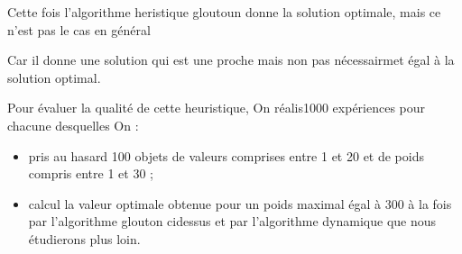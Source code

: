 \documentclass[letterpaper,10pt,english]{jupyterBook}
\begin{document}
\sphinxAtStartPar
Cette fois l’algorithme heristique gloutoun donne la solution optimale, mais ce n’est pas le cas en général

\sphinxAtStartPar
Car il donne une solution qui est une proche mais non pas nécessairmet égal à la solution optimal.

\sphinxAtStartPar
Pour évaluer la qualité de cette heuristique, On réalis1000 expériences pour chacune desquelles On :
\begin{itemize}
\item {} 
\sphinxAtStartPar
pris au hasard 100 objets de valeurs comprises entre 1 et 20 et de poids compris entre 1 et 30 ;

\item {} 
\sphinxAtStartPar
calcul la valeur optimale obtenue pour un poids maximal égal à 300 à la fois par l’algorithme glouton
ci\sphinxhyphen{}dessus et par l’algorithme dynamique que nous étudierons plus loin.

\end{itemize}
\begin{sphinxVerbatimInput}

\begin{sphinxVerbatim}[commandchars=\\\{\}]
 
    \PYG{p}{[}\PYG{p}{]}
    \PYG{p}{[}\PYG{p}{]}
       
        \PYG{p}{[}\PYG{p}{]}\PYG{p}{[}\PYG{p}{]}\PYG{p}{[}\PYG{p}{]}
        \PYG{p}{[}\PYG{p}{]}\PYG{p}{[}\PYG{p}{]}  
     
\end{sphinxVerbatim}
\end{sphinxVerbatimInput}
\end{document}
